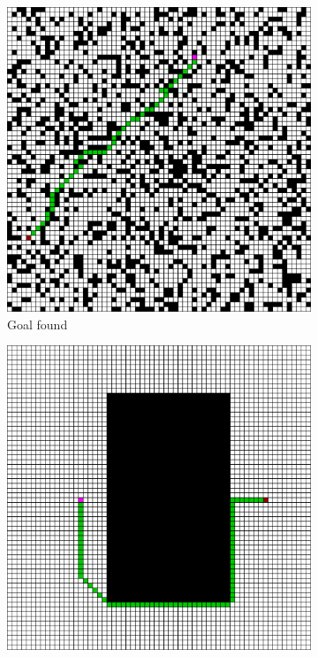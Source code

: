 \begin{figure}[h!]
  \centerfloat
  \begin{subfigure}[b]{0.33\linewidth}
    \includegraphics[width=\linewidth]{images/lstm_1_all.png}
     \caption{Goal found}
  \end{subfigure}
  \hfill
  \begin{subfigure}[b]{0.33\linewidth}
    \includegraphics[width=\linewidth]{images/lstm_2_all.png}

\end{subfigure}
\end{figure}
